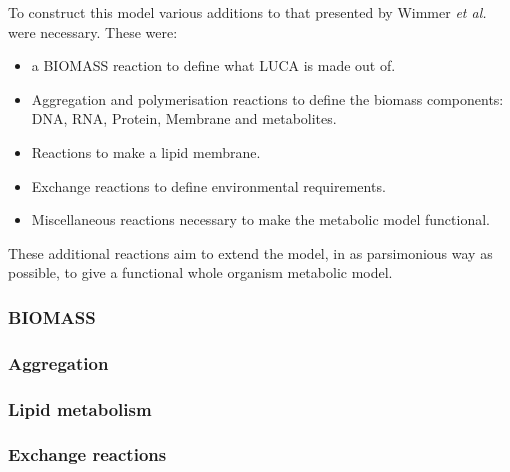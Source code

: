 \documentclass[10pt]{article}
\begin{document}
To construct this model various additions to that presented by Wimmer \textit{et al.} \cite{Wimmers} were necessary. These were:
\begin{itemize}
 \item a BIOMASS reaction to define what LUCA is made out of.
 \item Aggregation and polymerisation reactions to define the biomass components: DNA, RNA, Protein, Membrane and metabolites.
 \item Reactions to make a lipid membrane.
 \item Exchange reactions to define environmental requirements.
 \item Miscellaneous reactions necessary to make the metabolic model functional.
\end{itemize}
These additional reactions aim to extend the model, in as parsimonious way as possible, to give a functional whole organism metabolic model.
\subsubsection*{BIOMASS}
\subsubsection*{Aggregation}
\subsubsection*{Lipid metabolism}
\subsubsection*{Exchange reactions}
\end{document}
